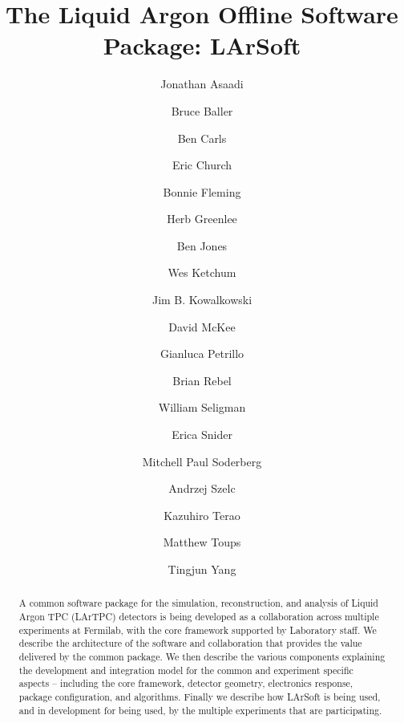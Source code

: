 \documentclass[12pt]{elsarticle}
\begin{document}
\title{The Liquid Argon Offline Software Package: LArSoft} 
\author{Jonathan Asaadi}
\address{}
\author{Bruce Baller}
\address{}
\author{Ben Carls}
\address{}
\author{Eric Church}
\address{Fermi National Accelerator Lab, Batavia, IL, USA, 60510-5011}
\author{Bonnie Fleming}
\address{Physics Department, Yale University, New Haven, CT, USA, 12345-1234}
\author{Herb Greenlee}
\address{Fermi National Accelerator Lab, Batavia, IL, USA, 60510-5011}
\author{Ben Jones}
\address{Massachusetts Institute of Technology, 77 Massachusetts Ave, Cambridge, MA 02139}
\author{Wes Ketchum}
\address{}
\author{Jim B. Kowalkowski}
\address{Fermi National Accelerator Lab, Batavia, IL, USA, 60510-5011}
\author{David McKee}
\address{}

\author{Gianluca Petrillo}
\address{Fermi National Accelerator Lab, Batavia, IL, USA, 60510-5011}
\author{Brian Rebel}
\address{Fermi National Accelerator Lab, Batavia, IL, USA, 60510-5011}
\author{William Seligman}
\address{}
\author{Erica Snider}
\address{Fermi National Accelerator Lab, Batavia, IL, USA, 60510-5011}
\author{Mitchell Paul Soderberg}
\address{Fermi National Accelerator Lab, Batavia, IL, USA, 60510-5011}

\author{Andrzej Szelc}
\address{}

\author{Kazuhiro Terao}
\address{}
\author{Matthew Toups}
\address{}
\author{Tingjun Yang}
\address{Fermi National Accelerator Lab, Batavia, IL, USA, 60510-5011}
\begin{abstract}
A common software package for the simulation, reconstruction, and analysis of Liquid Argon TPC (LArTPC) detectors is being developed as a collaboration across multiple experiments at Fermilab, with the core framework supported by Laboratory staff. We describe the architecture of the software and collaboration that provides the value delivered by the common package. We then describe the various components explaining the development and integration model for the common and experiment specific aspects – including the core framework, detector geometry, electronics response, package configuration, and algorithms. Finally we describe how LArSoft is being used, and in development for being used, by the multiple experiments that are participating.

\end{abstract}
\tableofcontents
\end{document}
